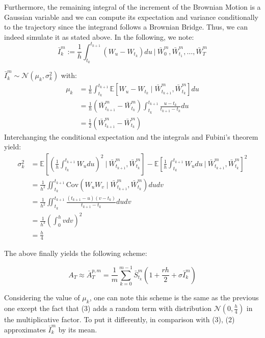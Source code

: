 \documentclass{article}
\begin{document}
Furthermore, the remaining integral of the increment of the Brownian Motion is a Gaussian variable and we can
compute its expectation and variance conditionally to the trajectory since the integrand follows a Brownian Bridge.
Thus, we can indeed simulate it as stated above. In the following, we note:
\[
	\bar I_k^m := \frac{1}{h}
	\int_{t_k}^{t_{k+1}} \left( W_u - W_{t_k} \right) du \ \Big\vert \ \bar W_0^m, \bar W_{t_1}^m, \dots, \bar W_T^m
\]

$\bar I_k^m \sim \mathcal N(\mu_k, \sigma_k^2)$ with:
\begin{align*}
	\mu_k
	&= \frac{1}{h} \int_{t_k}^{t_{k+1}} \mathbb E \left[ W_u - W_{t_k} \mid \bar W_{t_{k+1}}^m, \bar W_{t_k}^m \right] du \\
	&= \frac{1}{h} \left( \bar W_{t_{k+1}}^m - \bar W_{t_k}^m \right) \int_{t_k}^{t_{k+1}} \frac{u - t_k}{t_{k+1} - t_k} du \\
	&= \frac{1}{2} \left( \bar W_{t_{k+1}}^m - \bar W_{t_k}^m \right)
\end{align*}
Interchanging the conditional expectation and the integrals and Fubini's theorem yield:
\begin{align*}
	\sigma_k^2 &= \mathbb E \left[ \left( \frac{1}{h}
		\int_{t_k}^{t_{k+1}} W_u du \right)^2 \ \Big\vert \ \bar W_{t_{k+1}}^m, \bar W_{t_k}^m \right]
		- \mathbb E \left[ \frac{1}{h} \int_{t_k}^{t_{k+1}} W_u du \ \Big\vert \ \bar W_{t_{k+1}}^m, \bar W_{t_k}^m \right]^2
		\\
	&= \frac{1}{h^2} \iint_{t_k}^{t_{k+1}}
		\mathrm{Cov} \left( W_u W_v \mid \bar W_{t_{k+1}}^m, \bar W_{t_k}^m \right) du dv \\
	&= \frac{1}{h^2} \iint_{t_k}^{t_{k+1}} \frac{(t_{k+1} - u)(v - t_k)}{t_{k+1} - t_k} du dv \\
	&= \frac{1}{h^3} \left( \int_{0}^{h} v dv \right)^2 \\
	&= \frac{h}{4}
\end{align*}

The above finally yields the following scheme:

\begin{equation}
    A_T \approx \bar A_T^{p, m} = \frac{1}{m} \sum_{k=0}^{m-1}
    	\bar S_{t_k}^m \left( 1 + \frac{rh}{2} + \sigma \bar I_k^m \right) \tag{3}
\end{equation}

Considering the value of $\mu_k$, one can note this scheme is the same as the previous one except the fact
that (3) adds a random term with distribution $\mathcal N(0, \frac{h}{4})$ in the multiplicative factor.
To put it differently, in comparison with (3), (2) approximates $\bar I_k^m$ by its mean.
\end{document}
